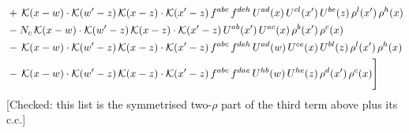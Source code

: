 \documentclass[9pt]{article}
\numberwithin{equation}{section}
\begin{document}
\begin{align}
&+\,\mathcal{K}(x-w)\cdot\mathcal{K}(w'-z)\,\mathcal{K}(x-z)\cdot\mathcal{K}(x'-z)\,f^{abc}\,f^{deh}\,U^{ad}(x)\,U^{cl}(x')\,U^{be}(z)\,\rho^{l}(x')\,\rho^{h}(x)\notag \\ 
&-N_{c}\,\mathcal{K}(x-w)\cdot\mathcal{K}(w'-z)\,\mathcal{K}(x-z)\cdot\mathcal{K}(x'-z)\,U^{ab}(x')\,U^{ac}(x)\,\rho^{b}(x')\,\rho^{c}(x)\notag \\ 
&-\,\mathcal{K}(x-w)\cdot\mathcal{K}(w'-z)\,\mathcal{K}(x-z)\cdot\mathcal{K}(x'-z)\,f^{abc}\,f^{deh}\,U^{ad}(w)\,U^{ce}(x)\,U^{bl}(z)\,\rho^{l}(x')\,\rho^{h}(x)\notag \\ 
&-\,\mathcal{K}(x-w)\cdot\mathcal{K}(w'-z)\,\mathcal{K}(x-z)\cdot\mathcal{K}(x'-z)\,f^{abc}\,f^{dae}\,U^{hb}(w)\,U^{he}(z)\,\rho^{d}(x')\,\rho^{c}(x)\Bigg]
\end{align} {\color{red}[Checked: this list is the symmetrised two-$\rho$ part of the third term above plus its c.c.]}\par\noindent
\end{document}
